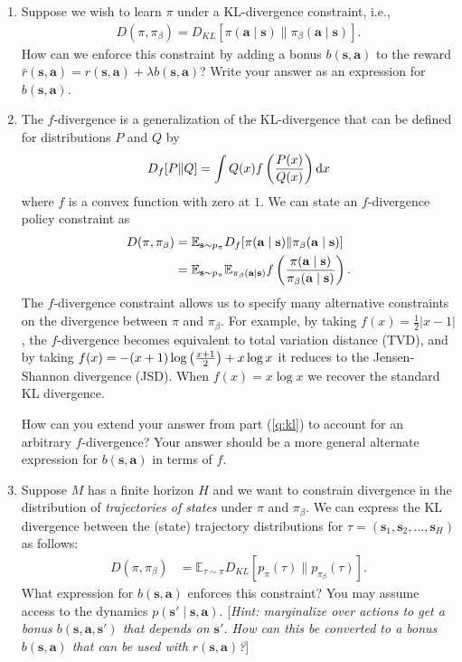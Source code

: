 \documentclass{article}
\def\s{\mathbf{s}}
\def\a{\mathbf{a}}
\def\E{\mathbb{E}}
\def\pib{\pi_{\beta}}
\begin{document}
\begin{enumerate}

	\item\label{q:kl} Suppose we wish to learn $\pi$ under a KL-divergence constraint, i.e., 
	\begin{align*}
		D(\pi,\pib)=D_{KL}[\pi(\a\mid\s)\|\pib(\a\mid\s)].
	\end{align*}
	How can we enforce this constraint by adding a bonus $b(\s,\a)$ to the reward $\bar r(\s,\a)=r(\s,\a)+\lambda b(\s,\a)$? Write your answer as an expression for $b(\s,\a)$.
	
    \begin{sol}
    \end{sol}

	\item The $f$-divergence is a generalization of the KL-divergence that can be defined for distributions $P$ and $Q$ by $$D_f[P\|Q]=\int Q(x)f\left(P(x) \over Q(x)\right)\mathrm dx$$ where $f$ is a convex function with zero at $1$. We can state an $f$-divergence policy constraint as 
	\begin{align*}
	    D(\pi,\pib)&=\E_{\s\sim p_\pi}D_{f}[\pi(\a\mid\s)\|\pib(\a\mid\s)]\\
	    &= \E_{\s\sim p_\pi}\E_{\pib(\a\mid\s)}f\left(\pi(\a\mid\s)\over\pib(\a\mid\s)\right).
   	\end{align*}
   	The $f$-divergence constraint allows us to specify many alternative constraints on the divergence between $\pi$ and $\pib$. For example, by taking $f(x)=\frac12|x-1|$, the $f$-divergence becomes equivalent to total variation distance (TVD), and by taking $f(x)=-(x+1)\log\left(x+1\over2\right)+x\log x$ it reduces to the Jensen-Shannon divergence (JSD). When $f(x)=x\log x$ we recover the standard KL divergence.
   	
   	How can you extend your answer from part (\ref{q:kl}) to account for an arbitrary $f$-divergence? Your answer should be a more general alternate expression for $b(\s,\a)$ in terms of $f$.
	
    \begin{sol}
    \end{sol}

    \item Suppose $M$ has a finite horizon $H$ and we want to constrain divergence in the distribution of \emph{trajectories of states} under $\pi$ and $\pib$. We can express the KL divergence between the (state) trajectory distributions for $\tau=(\s_1,\s_2,\ldots,\s_H)$ as follows:
	\begin{align*}
	    D(\pi,\pib)&=\E_{\tau\sim\pi}D_{KL}[p_{\pi}(\tau)\|p_{\pib}(\tau)].
   	\end{align*} 
   	What expression for $b(\s,\a)$ enforces this constraint? You may assume access to the dynamics $p(\s'\mid\s,\a)$. [\emph{Hint: marginalize over actions to get a bonus $b(\s,\a,\s')$ that depends on $\s'$. How can this be converted to a bonus $b(\s,\a)$ that can be used with $r(\s,\a)$?}]

    \begin{sol}
    \end{sol}
\end{enumerate}
\end{document}
